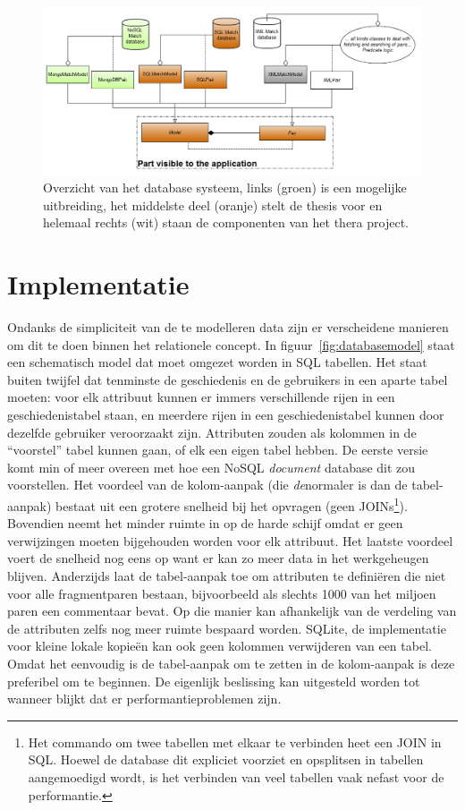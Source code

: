 \begin{figure}[ht]
	\begin{center}
		\includegraphics[width=1.0\columnwidth]{images/databaselayer.png}
		\caption{Overzicht van het database systeem, links (groen) is een mogelijke uitbreiding, het middelste deel (oranje) stelt de thesis voor en helemaal rechts (wit) staan de componenten van het thera project.}
		\label{fig:databaselayer}
	\end{center}
\end{figure}

\section{Implementatie}
Ondanks de simpliciteit van de te modelleren data zijn er verscheidene manieren om dit te doen binnen het relationele concept. In figuur~\ref{fig:databasemodel} staat een schematisch model dat moet omgezet worden in SQL tabellen. Het staat buiten twijfel dat tenminste de geschiedenis en de gebruikers in een aparte tabel moeten: voor elk attribuut kunnen er immers verschillende rijen in een geschiedenistabel staan, en meerdere rijen in een geschiedenistabel kunnen door dezelfde gebruiker veroorzaakt zijn. Attributen zouden als kolommen in de ``voorstel'' tabel kunnen gaan, of elk een eigen tabel hebben. De eerste versie komt min of meer overeen met hoe een NoSQL \emph{document} database dit zou voorstellen. Het voordeel van de kolom-aanpak (die \emph{de}normaler is dan de tabel-aanpak) bestaat uit een grotere snelheid bij het opvragen (geen JOINs\footnote{Het commando om twee tabellen met elkaar te verbinden heet een JOIN in SQL. Hoewel de database dit expliciet voorziet en opsplitsen in tabellen aangemoedigd wordt, is het verbinden van veel tabellen vaak nefast voor de performantie.}). Bovendien neemt het minder ruimte in op de harde schijf omdat er geen verwijzingen moeten bijgehouden worden voor elk attribuut. Het laatste voordeel voert de snelheid nog eens op want er kan zo meer data in het werkgeheugen blijven. Anderzijds laat de tabel-aanpak toe om attributen te defini\"eren die niet voor alle fragmentparen bestaan, bijvoorbeeld als slechts 1000 van het miljoen paren een commentaar bevat. Op die manier kan afhankelijk van de verdeling van de attributen zelfs nog meer ruimte bespaard worden. SQLite, de implementatie voor kleine lokale kopie\"en kan ook geen kolommen verwijderen van een tabel. Omdat het eenvoudig is de tabel-aanpak om te zetten in de kolom-aanpak is deze preferibel om te beginnen. De eigenlijk beslissing kan uitgesteld worden tot wanneer blijkt dat er performantieproblemen zijn.\\

